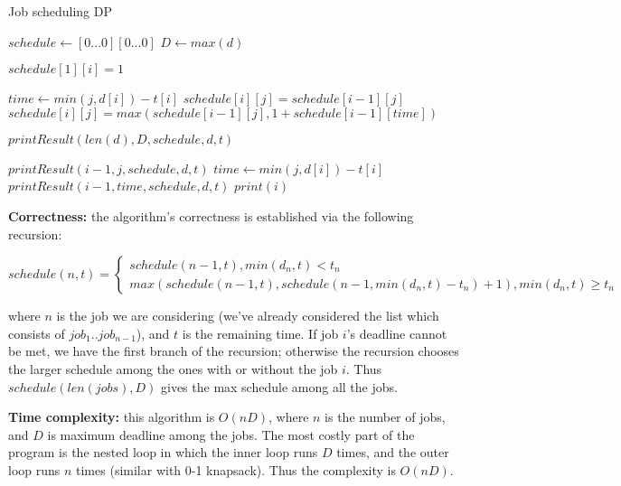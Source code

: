 \documentclass{article}
\begin{document}
\begin{description}
  \begin{algorithm}[H]
  \caption{Job scheduling DP}
  \label{alg:job-scheduling-dp}
    \begin{algorithmic}[1]

      \State $schedule \gets [0...0][0...0]$
      \State $D \gets max(d)$

        \State $schedule[1][i] = 1$
      \EndFor

          \State $time \gets min(j, d[i]) - t[i]$
            \State $schedule[i][j] = schedule[i-1][j]$
          \Else
            \State $schedule[i][j] = max(schedule[i-1][j], 1 + schedule[i-1][time])$
          \EndIf
        \EndFor
      \EndFor

      \State $printResult(len(d), D, schedule, d, t)$
      \State {}
    \EndFunction

        \State \Return {}
      \EndIf

        \State $printResult(i-1, j, schedule, d, t)$
      \Else
        \State $time \gets min(j, d[i]) - t[i]$
        \State $printResult(i-1, time, schedule, d, t)$
        \State $print(i)$
      \EndIf
    \EndFunction

    \end{algorithmic}
  \end{algorithm}

  \textbf{Correctness:} the algorithm's correctness is established via the following recursion:

\[
  schedule(n,t) = \begin{cases}
                    schedule(n-1, t), min(d_n, t) < t_n \\
                    max(schedule(n-1, t), schedule(n-1, min(d_n, t) - t_n) + 1), min(d_n, t) \geq t_n
                  \end{cases}
\]

  where $n$ is the job we are considering (we've already considered the list which consists of $job_1..job_{n-1}$), and $t$ is the remaining time. If job $i$'s deadline cannot be met, we have the first branch of the recursion; otherwise the recursion chooses the larger schedule among the ones with or without the job $i$. Thus $schedule(len(jobs), D)$ gives the max schedule among all the jobs.
  
  \textbf{Time complexity:} this algorithm is $O(nD)$, where $n$ is the number of jobs, and $D$ is maximum deadline among the jobs. The most costly part of the program is the nested loop in which the inner loop runs $D$ times, and the outer loop runs $n$ times (similar with 0-1 knapsack). Thus the complexity is $O(nD)$.

\end{description}
\end{document}
